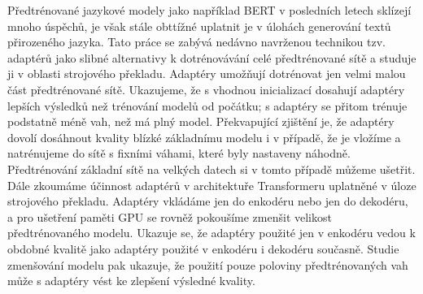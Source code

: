 Předtrénované jazykové modely jako například BERT v posledních letech sklízejí mnoho úspěchů, je však stále obttížné uplatnit je v úlohách generování textů přirozeného jazyka. Tato práce se zabývá nedávno navrženou technikou tzv. adaptérů jako slibné alternativy k dotrénovávání celé předtrénované sítě a studuje ji v oblasti strojového překladu. Adaptéry umožňují dotrénovat jen velmi malou část předtrénované sítě.
Ukazujeme, že s vhodnou inicializací dosahují adaptéry lepších výsledků než trénování modelů od počátku; s adaptéry se přitom trénuje podstatně méně vah, než má plný model.
Překvapující zjištění je, že adaptéry dovolí dosáhnout kvality blízké základnímu modelu i v případě, že je vložíme a natrénujeme do sítě s fixními váhami, které byly nastaveny náhodně. Předtrénování základní sítě na velkých datech si v tomto případě můžeme ušetřit.
Dále zkoumáme účinnost adaptérů v architektuře Transformeru uplatněné v úloze strojového překladu. Adaptéry vkládáme jen do enkodéru nebo jen do dekodéru, a pro ušetření paměti GPU se rovněž pokoušíme zmenšit velikost předtrénovaného modelu. Ukazuje se, že adaptéry použité jen v enkodéru vedou k obdobné kvalitě jako adaptéry použité v enkodéru i dekodéru současně. Studie zmenšování modelu pak ukazuje, že použití pouze poloviny předtrénovaných vah může s adaptéry vést ke zlepšení výsledné kvality.
